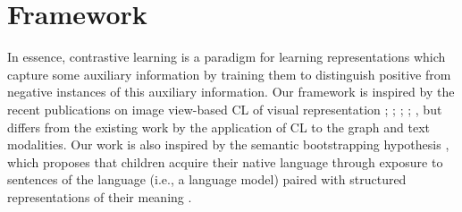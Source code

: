 \documentclass[11pt]{article}
\begin{document}
\begin{table}[!ht]
    \centering
    \caption{Statistics of 10-fold splits - ADE dataset}
\end{table}

\vspace{-1mm}

\section{Framework}

In essence, contrastive learning is a paradigm for learning representations which capture some auxiliary information by training them to distinguish positive from negative instances of this auxiliary information. Our framework is inspired by the recent publications on image view-based CL of visual representation \cite{NEURIPS2020_d89a66c7}; \cite{zhang2020contrastive}; \cite{henaff2020data}; \cite{chen2020simple}; \cite{he2020momentum}, but differs from the existing work by the application of CL to the graph and text modalities. Our work is also inspired by the semantic bootstrapping hypothesis \cite{pinker1996language}, which proposes that children acquire their native language through exposure to sentences of the language (i.e., a language model) paired with structured representations of their meaning \cite{abend2017bootstrapping}.
\end{document}
